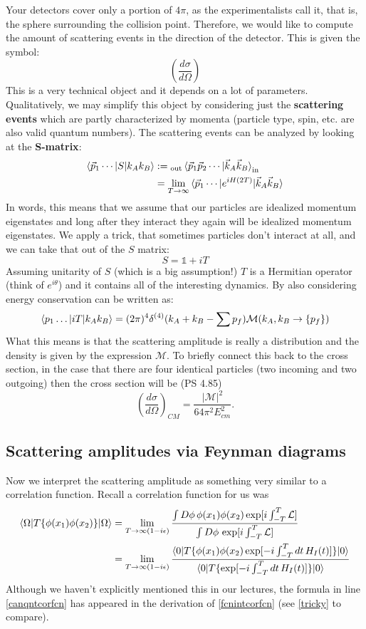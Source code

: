\documentclass{report}
\theoremstyle{plain}
\theoremstyle{definition}
\theoremstyle{remark}
\newcommand{\FR}[2]{\frac{#1}{#2}}
\newcommand{\PFR}[2]{\left(\frac{#1}{#2}\right)}
\newcommand{\mc}{\mathcal}
\newcommand{\iden}{\mathds{1}}
\begin{document}
Your detectors cover only a portion of $4\pi$, as the experimentalists call
it, that is, the sphere surrounding the collision point. Therefore, we
would like to compute the amount of scattering events in the direction of
the detector. This is given the symbol:
\[ \PFR{d\sigma}{d\Omega} \]
This is a very technical object and it depends on a lot of parameters.
Qualitatively, we may simplify this object by considering just the
\textbf{scattering events} which are partly characterized by momenta
(particle type, spin, etc. are also valid quantum numbers). The scattering
events can be analyzed by looking at the \textbf{S-matrix}:
\begin{align*}
\braket{\vec p_1\cdots|S|k_Ak_B}&:=
{}_{\text{out}}\braket{\vec p_1\vec p_2\cdots|\vec k_A\vec k_B}_{\text{in}}\\
&= \lim_{T\to\infty} \braket{\vec p_1\cdots|e^{iH(2T)}|\vec k_A\vec k_B}
\end{align*}
In words, this means that we assume that our particles are idealized
momentum eigenstates and long after they interact they again will be
idealized momentum eigenstates. We apply a trick, that sometimes particles
don't interact at all, and we can take that out of the $S$ matrix:
\[ S = \iden + i T \]
Assuming unitarity of $S$ (which is a big assumption!) $T$ is a Hermitian
operator (think of $e^{i\theta}$) and it contains all of the interesting
dynamics. By also considering energy conservation can be written as:
\[
\braket{p_1\dots| iT |k_Ak_B} 
=(2\pi)^4\delta^{(4)}(k_A+k_B-\sum p_f) \mc M(k_A,k_B\to\{p_f\})
\]
What this means is that the scattering amplitude is really a distribution
and the density is given by the expression $\mc M$. To briefly connect this
back to the cross section, in the case that there are four identical
particles (two incoming and two outgoing) then the cross section will be
(PS 4.85)
\[ \PFR{d\sigma}{d\Omega}_{CM} = \FR{|\mc M|^2}{64\pi^2E_{cm}^2}.\]
\subsection{Scattering amplitudes via Feynman diagrams}
Now we interpret the scattering amplitude as something very similar to a
correlation function. Recall a correlation function for us was
\begin{align}
\braket{\Omega|T\{\phi(x_1)\phi(x_2)\}|\Omega}
&= \lim_{T\to\infty(1-i\epsilon)}
\FR{ \int D\phi\, \phi(x_1)\phi(x_2) \exp[i\int_{-T}^T \mc L] }
{ \int D\phi\, \exp[i\int_{-T}^T \mc L] } \label{fcnintcorfcn}\\
&= 
\lim_{T\to\infty(1-i\epsilon)}
\FR{\braket{0|T\{\phi(x_1)\phi(x_2)\exp[-i\int_{-T}^Tdt\,H_I(t)]\}|0}}
{\braket{0|T\{\exp[-i\int_{-T}^Tdt\,H_I(t)]\}|0}}
\label{canqntcorfcn}
\end{align}
Although we haven't explicitly mentioned this in our lectures, the formula
in line \eqref{canqntcorfcn} has appeared in the derivation of
\eqref{fcnintcorfcn} (see \eqref{tricky} to compare). 
\end{document}
